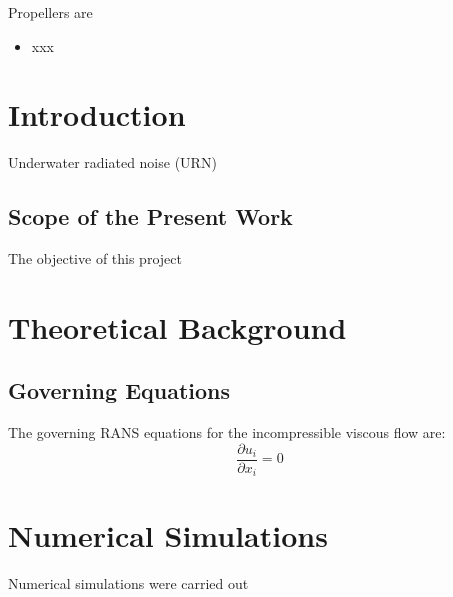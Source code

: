 \documentclass[onecolumn,11pt]{report}
\begin{document}
Propellers are 

\begin{itemize}

\item xxx

\end{itemize}



\newpage

\chapter{Introduction}

Underwater radiated noise (URN) 


\section{Scope of the Present Work}

The objective of this project 


\chapter{Theoretical Background}

\section{Governing Equations}

The governing RANS equations for the incompressible viscous flow are:
\begin{equation}
\frac{\partial u_i}{\partial x_i} = 0
\label{eq1}
\end{equation}  

 
 

\chapter{Numerical Simulations}

Numerical simulations were carried out 





\end{document}
